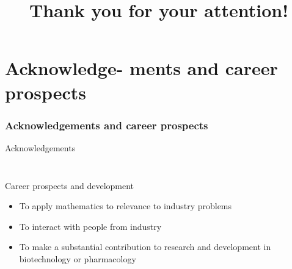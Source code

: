 \documentclass[handout]{beamer}
\begin{document}
\section{Acknowledge- ments and career prospects}
\begin{frame}
\frametitle{Acknowledgements and career prospects}
\begin{block}{Acknowledgements}
\begin{minipage}[b]{\textwidth}
\begin{columns}
\begin{column}{0.5\textwidth}
\center{\texttt{[image: EU]}}
\label{ris:EU}
\end{column}

\begin{column}{0.5\textwidth}
\center{\texttt{[image: WW]}}
\label{ris:WW}
\end{column}
\end{columns}
\end{minipage}

\end{block}
\begin{block}{Career prospects and development}
\begin{itemize}
\item To apply mathematics to relevance to industry problems\\
\item To interact with people from industry\\
\item To make a substantial contribution to research and development in biotechnology or pharmacology
\end{itemize}
\end{block}
\end{frame}

\section{}
\title{Thank you for your attention!}
\author{}
\date{}
\begin{frame}
\centering
\titlepage
\end{frame}
\end{document}
